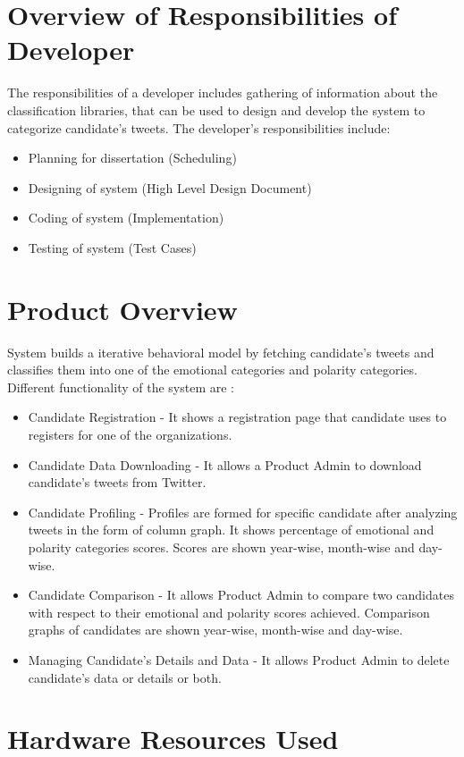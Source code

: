 \documentclass[oneside,a4paper,12pt]{pictreport}
\begin{document}
\section{Overview of Responsibilities of Developer}
The responsibilities of a developer includes gathering of information about the classification libraries, that can be used to design and develop the system to categorize candidate's tweets. The developer’s responsibilities include: 
\begin{itemize}
\item Planning for dissertation (Scheduling) 
\item Designing of system (High Level Design Document)
\item Coding of system (Implementation)
\item Testing of system (Test Cases)
\end{itemize}

\section{Product Overview}
System builds a iterative behavioral model by fetching candidate's tweets and classifies them into one of the emotional categories and polarity categories. Different functionality of the system are : 

\begin{itemize}
\item Candidate Registration - It shows a registration page that candidate uses to registers for one of the organizations.
\item Candidate Data Downloading - It allows a Product Admin to download candidate's tweets from Twitter.
\item Candidate Profiling - Profiles are formed for specific candidate after analyzing tweets in the form of column graph. It shows percentage of emotional and polarity categories scores. Scores are shown year-wise, month-wise and day-wise.
\item Candidate Comparison - It allows Product Admin to compare two candidates with respect to their emotional and polarity scores achieved. Comparison graphs of candidates are shown year-wise, month-wise and day-wise.
\item Managing Candidate's Details and Data - It allows Product Admin to delete candidate's data or details or both.
\end{itemize}
\section{Hardware Resources Used}
\end{document}
